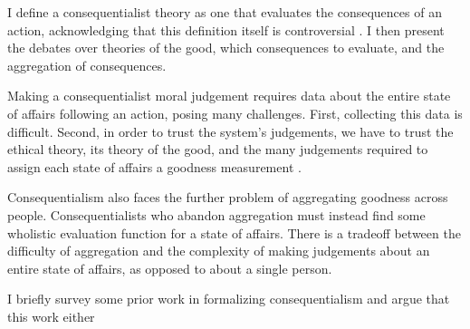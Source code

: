 \begin{isabellebody}
\isatagdocument
%
\isamarkuptrue%
%
\isamarkuptrue%
%
\endisatagdocument
{\isafolddocument}%
%
\isadelimdocument
%
\endisadelimdocument
%
\begin{isamarkuptext}%
I define a consequentialist theory as one that evaluates the consequences of an action, acknowledging 
that this definition itself is controversial \cite{consequentialismsep}. I then present the debates 
over theories of the good, which consequences to evaluate, and the aggregation of consequences.%
\end{isamarkuptext}\isamarkuptrue%
%
\isadelimdocument
%
\endisadelimdocument
%
\isatagdocument
%
\isamarkuptrue%
%
\isamarkuptrue%
%
\endisatagdocument
{\isafolddocument}%
%
\isadelimdocument
%
\endisadelimdocument
%
\begin{isamarkuptext}%
Making a consequentialist moral judgement requires data about the entire state of affairs following
an action, posing many challenges. First, collecting this data is difficult. Second, in order to trust 
the system's judgements, we have to trust the ethical theory, its theory of the good, and the many
judgements required to assign each state of affairs a goodness measurement \cite{utilsep}.%
\end{isamarkuptext}\isamarkuptrue%
%
\isadelimdocument
%
\endisadelimdocument
%
\isatagdocument
%
\isamarkuptrue%
%
\endisatagdocument
{\isafolddocument}%
%
\isadelimdocument
%
\endisadelimdocument
%
\begin{isamarkuptext}%
Consequentialism also faces the further problem of aggregating goodness across people. 
Consequentialists who abandon aggregation must instead find some wholistic evaluation function
for a state of affairs. There is a tradeoff between the difficulty of aggregation
and the complexity of making judgements about an entire state of affairs, as opposed to about a single person.%
\end{isamarkuptext}\isamarkuptrue%
%
\isadelimdocument
%
\endisadelimdocument
%
\isatagdocument
%
\isamarkuptrue%
%
\endisatagdocument
{\isafolddocument}%
%
\isadelimdocument
%
\endisadelimdocument
%
\begin{isamarkuptext}%
I briefly survey some prior work in formalizing consequentialism and argue that this work either

\end{isamarkuptext}
\end{isabellebody}
